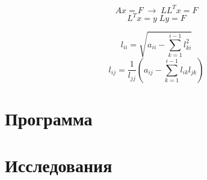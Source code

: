 \documentclass[oneside, final, 12pt]{extarticle}
\begin{document}
\[Ax=F\;\rightarrow\;LL^Tx=F\]
\[L^Tx=y\; Ly=F\]

\[l_{ii}=\sqrt{a_{ii}-\sum_{k=1}^{i-1}l_{ki}^2}\]
\[l_{ij}=\frac{1}{l_{jj}}\left(a_{ij}-\sum_{k=1}^{i-1}l_{ik}l_{jk}\right)\]

\section{Программа}
\lstset{caption=main.h}

\lstset{caption=main.cc}

\lstset{caption=SLE.h}

\lstset{caption=SLE.cc}


\section{Исследования}
\end{document}
